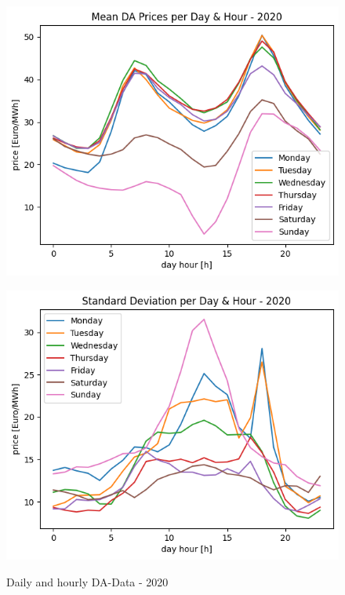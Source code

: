 \begin{figure}[H]
	\centering
	\begin{minipage}{0.49\textwidth}
		\includegraphics[width=1\linewidth]{pictures/DA/Mean DA Prices per Day and Hour - 2020.png}
		\label{fig:meanDA2020}
	\end{minipage} \hfill
	\begin{minipage}{0.49\textwidth}
		\includegraphics[width=1\linewidth]{pictures/DA/Standard Deviation per Day and Hour - 2020.png}
		\label{fig:stdDA2020}
	\end{minipage}
	\caption{Daily and hourly DA-Data - 2020 }
\end{figure}

